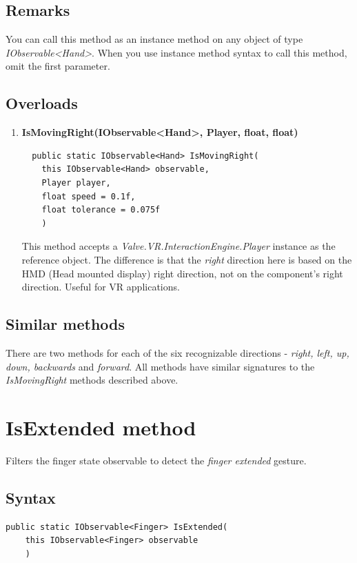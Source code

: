 \documentclass[12pt,a4paper,twoside]{report}
\begin{document}
\subsection{Remarks}
You can call this method as an instance method on any object of type \textit{IObservable<Hand>}. When you use instance method syntax to call this method, omit the first parameter.

\subsection{Overloads}
\begin{enumerate}
  \item \textbf{IsMovingRight(IObservable<Hand>, Player, float, float)}
\begin{lstlisting}
  public static IObservable<Hand> IsMovingRight(
    this IObservable<Hand> observable,
    Player player,
    float speed = 0.1f,
    float tolerance = 0.075f
    )
\end{lstlisting}
  This method accepts a \textit{Valve.VR.InteractionEngine.Player} instance as the reference object. The difference is that the \textit{right} direction here is based on the HMD (Head mounted display) right direction, not on the component's right direction. Useful for VR applications.
\end{enumerate}

\subsection{Similar methods}
There are two methods for each of the six recognizable directions - \textit{right, left, up, down, backwards} and \textit{forward}. All methods have similar signatures to the \textit{IsMovingRight} methods described above.

\section{IsExtended method}
Filters the finger state observable to detect the \textit{finger extended} gesture.

\subsection{Syntax}
\begin{lstlisting}[caption=Declaration]
  public static IObservable<Finger> IsExtended(
    this IObservable<Finger> observable
    )
\end{lstlisting}
\end{document}
